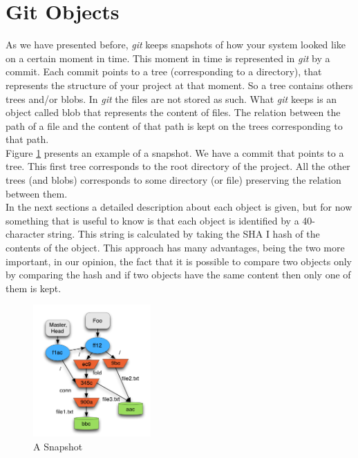 \section{Git Objects}
As we have presented before, \emph{git} keeps snapshots of how your system
looked like on a certain moment in time. This moment in time is
represented in \emph{git} by a commit. Each commit points to a tree
(corresponding to a directory), that
represents the structure of your project at that moment. So a tree
contains others trees and/or blobs. In \emph{git} the files are not stored as such. 
What \emph{git} keeps is an object called blob that represents the content of files. The
relation between the path of a file and the content of that path 
is kept on the trees corresponding to that path. \\

Figure \ref{fig:snapshot} presents an example of a snapshot. We
have a commit that points to a tree. This first tree corresponds to
the root directory of the project. All the other trees (and blobs)
corresponds to some directory (or file) preserving the relation
between them. \\

In the next sections a detailed description about each object is
given, but for now something that is useful to know is that each
object is identified by a 40-character string. This string is
calculated by taking the SHA I hash of the contents of the object.
This approach has many advantages, being the two more important, in our
opinion, the
fact that it is possible to compare two objects only by comparing the hash and
if two objects have the same content then only one of them is kept.

\begin{figure}[!h]
   \centering
   \includegraphics[width=0.4\textwidth]{images/object_assoc.png}
   \caption{A Snapshot}
   \label{fig:snapshot}
\end{figure}

